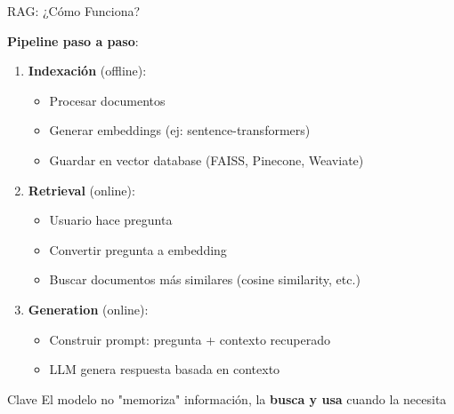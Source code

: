 \begin{frame}{RAG: ¿Cómo Funciona?}

\textbf{Pipeline paso a paso}:

\vspace{0.5em}

\begin{enumerate}
    \item \textbf{Indexación} (offline):
    \begin{itemize}
        \item Procesar documentos
        \item Generar embeddings (ej: sentence-transformers)
        \item Guardar en vector database (FAISS, Pinecone, Weaviate)
    \end{itemize}
    
    \vspace{0.3em}
    
    \item \textbf{Retrieval} (online):
    \begin{itemize}
        \item Usuario hace pregunta
        \item Convertir pregunta a embedding
        \item Buscar documentos más similares (cosine similarity, etc.)
    \end{itemize}
    
    \vspace{0.3em}
    
    \item \textbf{Generation} (online):
    \begin{itemize}
        \item Construir prompt: pregunta + contexto recuperado
        \item LLM genera respuesta basada en contexto
    \end{itemize}
\end{enumerate}

\vspace{0.5em}

\begin{block}{Clave}
El modelo no "memoriza" información, la \textbf{busca y usa} cuando la necesita
\end{block}

\end{frame}

